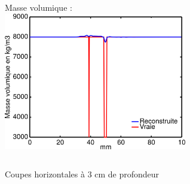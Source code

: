 \begin{frame}{\insertsectionhead}
\begin{small}
\begin{itemize}
\begin{columns}
		\centering
		Masse volumique : \\[0.2cm]
		\includegraphics[width=0.6\textwidth]{img/multi/coupe_rho_multi.png}\\
	\end{columns}
	
\end{itemize}
\hspace{2.7cm}Coupes horizontales à 3 cm de profondeur
\end{small}
\end{frame}


